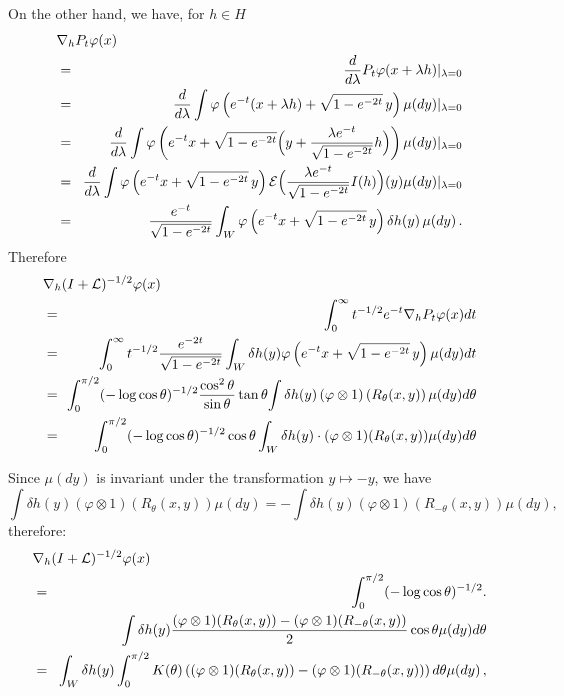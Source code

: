 \documentclass[12pt,a4paper]{book}
\begin{document}
\noindent
On the other hand, we have, for $h\in H$
\begin{eqnarray*}
\lefteqn{\nabla_hP_t\varphi(x)} \\
& = &\!
     \frac{d}{d\lambda}P_t\varphi(x+\lambda h)|_{\lambda=0} \\
& = &\! \frac{d}{d\lambda}\int\varphi\left(e^{-t}(x+\lambda h)+
               \sqrt{1-e^{-2t}}\,y\right)\mu(dy)|_{\lambda=0} \\
& = &\! \frac{d}{d\lambda}\int\varphi\left(e^{-t} x+\sqrt{1-e^{-2t}}
   \Big(y+\frac{\lambda e^{-t}}{\sqrt{1-e^{-2t}}}h\Big)\right)
       \mu(dy)|_{\lambda=0} \\
& = &\! \frac{d}{d\lambda}\int\varphi\left(e^{-t}x+\sqrt{1-e^{-2t}}\,y\right)
   {\mathcal E}\Big(\frac{\lambda e^{-t}}{\sqrt{1-e^{-2t}}}
        I(h)\Big)(y)\mu(dy)|_{\lambda=0} \\
& = &\! \frac{e^{-t}}{\sqrt{1-e^{-2t}}} \int_W\varphi
\left(e^{-t}x+\sqrt{1-e^{-2t}}\,y\right)\delta h(y)\,\mu(dy)\,.
\end{eqnarray*}
Therefore
\begin{eqnarray*}
\lefteqn{\nabla_h(I+{\mathcal L})^{-1/2}\varphi(x)}\\
& = &\!\!\int_0^\infty t^{-1/2}e^{-t}\nabla_h P_t\varphi(x)dt \\
& = &\!\!  \int_0^\infty t^{-1/2}\frac{e^{-2t}}{\sqrt{1-e^{-2t}}}
    \int_W \delta h(y)\varphi\left(e^{-t} x+
           \sqrt{1-e^{-2t}}\,y\right)\mu(dy)dt \\
& = &\!\!  \int_0^{\pi/2}(-\log\cos\theta)^{-1/2}
    \frac{\cos^2\theta}{\sin\theta}\tan\theta \!\int \delta
           h(y)\left(\varphi\otimes1\right)\left(R_\theta(x,y)\right)\mu(dy)d\theta \\
& = &\!\!  \int_0^{\pi/2}(-\log\cos\theta)^{-1/2}\cos\theta \int_W
   \delta h(y)\cdot(\varphi\otimes1)(R_\theta(x,y))\mu(dy)d\theta
\end{eqnarray*}

\noindent
Since $\mu(dy)$ is invariant under the transformation $y\mapsto -y$, we have
$$
\int\delta h(y)(\varphi\otimes1)(R_\theta(x,y))\mu(dy)=-\int \delta
h(y)(\varphi\otimes1)(R_{-\theta}(x,y))\mu(dy),
$$
therefore:
\begin{eqnarray*}
\lefteqn{\nabla_h(I+{\mathcal L})^{-1/2}\varphi(x)} \\
&= & \!\int_0^{\pi/2}(-\log\cos\theta)^{-1/2}.\\
&& \quad \int\delta h(y)
    \frac{(\varphi\otimes1)(R_\theta(x,y))
              -(\varphi\otimes1)(R_{-\theta}(x,y))}{2}\cos\theta \mu(dy)d\theta\\
&= &\! \int_W\delta h(y)\int_0^{\pi/2}
     K(\theta)\left({(\varphi\otimes1)(R_\theta(x,y))-(\varphi\otimes1)(R_{-\theta}(x,y))}\right)
     d\theta\mu(dy)\, ,
\end{eqnarray*}
\end{document}
